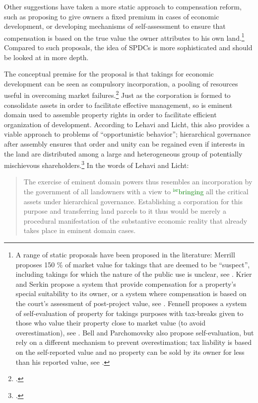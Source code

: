 \documentclass[12pt,a4paper]{book} %
\newcommand{\isr}[1]{\textcolor{green}{$^{\textrm{isr}}${#1}}}
\begin{document}
Other suggestions have taken a more static approach to compensation reform, such as proposing to give owners a fixed premium in cases of economic development, or developing mechanisms of self-assessment to ensure that compensation is based on the true value the owner attributes to his own land.\footnote{A range of static proposals have been proposed in the literature: Merrill proposes 150 \% of market value for takings that are deemed to be ``suspect'', including takings for which the nature of the public use is unclear, see \cite[90-93]{merrill86}. Krier and Serkin propose a system that provide compensation for a property's special suitability to its owner, or a system where compensation is based on the court's assessment of post-project value, see \cite[865-873]{krier04}. Fennell proposes a system of self-evaluation of property for takings purposes with tax-breaks given to those who value their property close to market value (to avoid overestimation), see \cite[995-996]{fennell04}. Bell and Parchomovsky also propose self-evaluation, but rely on a different mechanism to prevent overestimation; tax liability is based on the self-reported value and no property can be sold by its owner for less than his reported value, see \cite[890-900]{bell07}.} Compared to such proposals, the idea of SPDCs is more sophisticated and should be looked at in more depth. 

The conceptual premise for the proposal is that takings for economic development can be seen as compulsory incorporation, a pooling of resources useful in overcoming market failures.\footcite[1732-1733]{lehavi07} Just as the corporation is formed to consolidate assets in order to facilitate effective management, so is eminent domain used to assemble property rights in order to facilitate efficient organization of development. According to Lehavi and Licht, this also provides a viable approach to problems of ``opportunistic behavior''; hierarchical governance after assembly ensures that order and unity can be regained even if interests in the land are distributed among a large and heterogeneous group of potentially mischievous shareholders.\footcite[1733]{lehavi07} In the words of Lehavi and Licht:

\begin{quote}
The exercise of eminent domain powers thus resembles an incorporation by the government of all landowners with a view to \isr{bringing} all the critical assets under hierarchical governance. Establishing a corporation for this purpose and transferring land parcels to it thus would be merely a procedural manifestation of the substantive economic reality that already takes place in eminent domain cases.
\end{quote}
\end{document}
